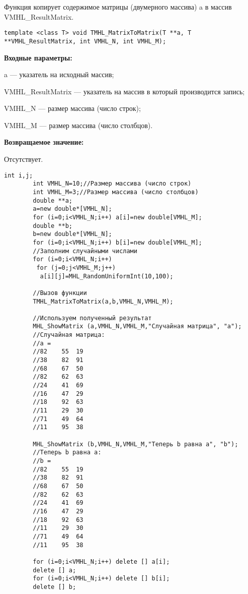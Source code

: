 \documentclass[a4paper,12pt]{article}
\begin{document}
Функция копирует содержимое матрицы (двумерного массива) a в массив VMHL\_ResultMatrix.


\begin{lstlisting}[label=code_syntax_TMHL_MatrixToMatrix,caption=Синтаксис]
template <class T> void TMHL_MatrixToMatrix(T **a, T **VMHL_ResultMatrix, int VMHL_N, int VMHL_M);
\end{lstlisting}

\textbf{Входные параметры:}  
 
a --- указатель на исходный массив;
 
VMHL\_ResultMatrix --- указатель на массив в который производится запись;
 
VMHL\_N --- размер массива (число строк);
 
VMHL\_M --- размер массива (число столбцов).

\textbf{Возвращаемое значение:}

Отсутствует.


\begin{lstlisting}[label=code_use_TMHL_MatrixToMatrix,caption=Пример использования]
        int i,j;
        int VMHL_N=10;//Размер массива (число строк)
        int VMHL_M=3;//Размер массива (число столбцов)
        double **a;
        a=new double*[VMHL_N];
        for (i=0;i<VMHL_N;i++) a[i]=new double[VMHL_M];
        double **b;
        b=new double*[VMHL_N];
        for (i=0;i<VMHL_N;i++) b[i]=new double[VMHL_M];
        //Заполним случайными числами
        for (i=0;i<VMHL_N;i++)
         for (j=0;j<VMHL_M;j++)
          a[i][j]=MHL_RandomUniformInt(10,100);

        //Вызов функции
        TMHL_MatrixToMatrix(a,b,VMHL_N,VMHL_M);

        //Используем полученный результат
        MHL_ShowMatrix (a,VMHL_N,VMHL_M,"Случайная матрица", "a");
        //Случайная матрица:
        //a =	
        //82	55	19
        //38	82	91
        //68	67	50
        //82	62	63
        //24	41	69
        //16	47	29
        //18	92	63
        //11	29	30
        //71	49	64
        //11	95	38
        
        MHL_ShowMatrix (b,VMHL_N,VMHL_M,"Теперь b равна a", "b");
        //Теперь b равна a:
        //b =	
        //82	55	19
        //38	82	91
        //68	67	50
        //82	62	63
        //24	41	69
        //16	47	29
        //18	92	63
        //11	29	30
        //71	49	64
        //11	95	38
        
        for (i=0;i<VMHL_N;i++) delete [] a[i];
        delete [] a;
        for (i=0;i<VMHL_N;i++) delete [] b[i];
        delete [] b;
\end{lstlisting}
\end{document}
